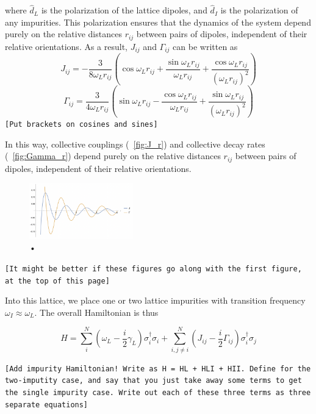 \documentclass[aps,pra,superscriptaddress,twocolumn]{revtex4-1}
\newcommand{\fref}[1]{\text{Fig.}~\ref{#1}}
\newcommand{\commentSB}[1]{\texttt{\color{blue}[#1]}}
\newcommand{\commentTP}[1]{\texttt{\color{green}[#1]}}
\begin{document}
where $\hat{d}_L$ is the polarization of the lattice dipoles, and $\hat{d}_I$ is the polarization of any impurities. This polarization ensures that the dynamics of the system depend purely on the relative distances $r_{ij}$ between pairs of dipoles, independent of their relative orientations. As a result, $J_{ij}$ and $\Gamma_{ij}$ can be written as 
\begin{equation} J_{ij} = -\frac{3}{8 \omega_L r_{ij}} \left( \cos \omega_L r_{ij} + \frac{\sin \omega_L r_{ij}}{\omega_L r_{ij}} + \frac{\cos \omega_L r_{ij}}{(\omega_L r_{ij})^2} \right) \end{equation}
\begin{equation} \Gamma_{ij} = \frac{3}{4\omega_L r_{ij}} \left( \sin\omega_L r_{ij} - \frac{\cos\omega_L r_{ij}}{\omega_L r_{ij}} + \frac{\sin\omega_L r_{ij}}{(\omega_L r_{ij})^2} \right) \end{equation}
\commentTP{Put brackets on cosines and sines}

In this way, collective couplings (\fref{fig:J_r}) and collective decay rates (\fref{fig:Gamma_r}) depend purely on the relative distances $r_{ij}$ between pairs of dipoles, independent of their relative orientations. 

\begin{figure}
    \includegraphics[width=0.4\textwidth]{figures/J_and_Gamma.png} 
    \caption{•}
    \label{fig:J_and_Gamma.png}
\end{figure}

\commentSB{It might be better if these figures go along with the first figure, at the top of this page}

Into this lattice, we place one or two lattice impurities with transition frequency $\omega_I \approx \omega_L$. The overall Hamiltonian is thus 

\begin{equation}   
    H = \sum_i^N \left( \omega_L - \frac{i}{2} \gamma_L \right) \sigma_i^\dag \sigma_i + \sum_{i,j \neq i}^N \left( J_{ij} - \frac{i}{2} \Gamma_{ij} \right) \sigma_i^\dag \sigma_j 
    \label{eqn:Hamiltonian}
\end{equation}

\commentTP{Add impurity Hamiltonian! Write as H = HL + HLI + HII. Define for the two-imputity case, and say that you just take away some terms to get the single impurity case. Write out each of these three terms as three separate equations}
\end{document}
